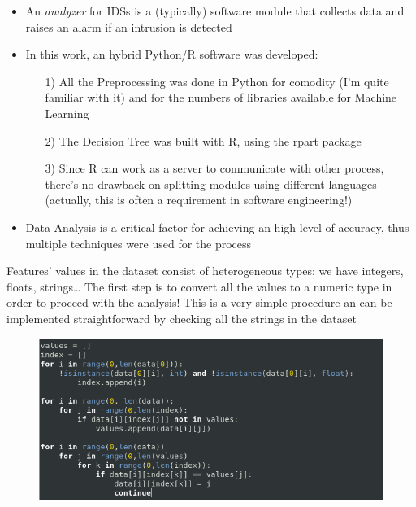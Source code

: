 	\begin{frame}
		\begin{itemize}
			\item An \emph{analyzer} for IDSs is a (typically) software module that collects data and raises an alarm if an intrusion is detected
			\item In this work, an hybrid Python/R software was developed:
			\begin{itemize}
				\item[1)] All the Preprocessing was done in Python for comodity (I'm quite familiar with it) and for the numbers of libraries available for Machine Learning
				\item[2)] The Decision Tree was built with R, using the rpart package
				\item[3)] Since R can work as a server to communicate with other process, there's no drawback on splitting modules using different languages (actually, this is often a requirement in software engineering!)
			\end{itemize}
			\item Data Analysis is a critical factor for achieving an high level of accuracy, thus multiple techniques were used for the process
		\end{itemize}
	\end{frame}
	
	\begin{frame}
	\vspace{0.5cm}
		Features' values in the dataset consist of heterogeneous types: we have integers, floats, strings\dots\newline\newline
		The first step is to convert all the values to a numeric type in order to proceed with the analysis! This is a very simple procedure an can be implemented straightforward by checking all the strings in the dataset
			\begin{figure}
				\includegraphics[width=\textwidth,height=0.85\textheight,keepaspectratio]{img/PreprocessCode.png}
			\end{figure}
	\end{frame}
	

